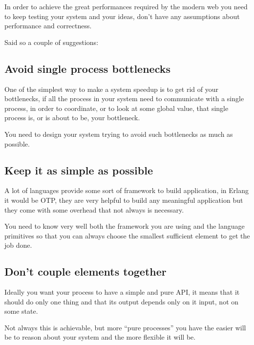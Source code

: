 \documentclass[12pt]{article} %
\begin{document}
In order to achieve the great performances required by the modern web you need to keep testing your system and your ideas, don't have any assumptions about performance and correctness.

Said so a couple of suggestions:

	\subsection{Avoid single process bottlenecks}
	
One of the simplest way to make a system speedup is to get rid of your bottlenecks, if all the process in your system need to communicate with a single process, in order to coordinate, or to look at some global value, that single process is, or is about to be, your bottleneck.

You need to design your system trying to avoid such bottlenecks as much as possible.
	
	\subsection{Keep it as simple as possible}

A lot of languages provide some sort of framework to build application, in Erlang it would be OTP, they are very helpful to build any meaningful application but they come with some overhead that not always is necessary.

You need to know very well both the framework you are using and the language primitives so that you can always choose the smallest sufficient element to get the job done.

	\subsection{Don't couple elements together}

Ideally you want your process to have a simple and pure API, it means that it should do only one thing and that its output depends only on it input, not on some state.

Not always this is achievable, but more ``pure processes'' you have the easier will be to reason about your system and the more flexible it will be.
\end{document}
